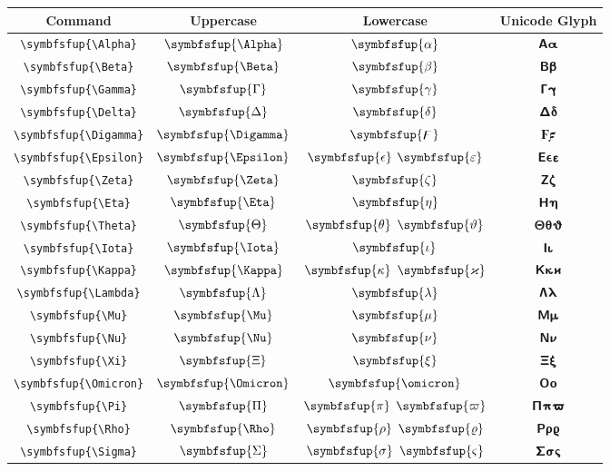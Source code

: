 \documentclass[12pt,a4paper]{article}
\begin{document}
\begin{longtable}{|c|c|c|c|}
\hline
\textbf{Command} & \textbf{Uppercase} & \textbf{Lowercase} & \textbf{Unicode Glyph} \\
\hline
\verb|\symbfsfup{\Alpha}| & $\symbfsfup{\Alpha}$ & $\symbfsfup{\alpha}$ & $ 𝝖 𝝰 $ \\
\verb|\symbfsfup{\Beta}| & $\symbfsfup{\Beta}$ & $\symbfsfup{\beta}$ & $ 𝝗 𝝱 $ \\
\verb|\symbfsfup{\Gamma}| & $\symbfsfup{\Gamma}$ & $\symbfsfup{\gamma}$ & $ 𝝘 𝝲 $ \\
\verb|\symbfsfup{\Delta}| & $\symbfsfup{\Delta}$ & $\symbfsfup{\delta}$ & $ 𝝙 𝝳 $ \\
\verb|\symbfsfup{\Digamma}| & $\symbfsfup{\Digamma}$ & $\symbfsfup{\digamma}$ & $ 𝟊 𝟋 $ \\
\verb|\symbfsfup{\Epsilon}| & $\symbfsfup{\Epsilon}$ & $\symbfsfup{\epsilon}$ $\symbfsfup{\varepsilon}$ & $ 𝝚 𝞊 𝝴 $ \\
\verb|\symbfsfup{\Zeta}| & $\symbfsfup{\Zeta}$ & $\symbfsfup{\zeta}$ & $ 𝝛 𝝵 $ \\
\verb|\symbfsfup{\Eta}| & $\symbfsfup{\Eta}$ & $\symbfsfup{\eta}$ & $ 𝝜 𝝶 $ \\
\verb|\symbfsfup{\Theta}| & $\symbfsfup{\Theta}$ & $\symbfsfup{\theta}$ $\symbfsfup{\vartheta}$ & $ 𝝝 𝝷 𝞋 $ \\
\verb|\symbfsfup{\Iota}| & $\symbfsfup{\Iota}$ & $\symbfsfup{\iota}$ & $ 𝝞 𝝸 $ \\
\verb|\symbfsfup{\Kappa}| & $\symbfsfup{\Kappa}$ & $\symbfsfup{\kappa}$ $\symbfsfup{\varkappa}$ & $ 𝝟 𝝹 𝞌 $ \\
\verb|\symbfsfup{\Lambda}| & $\symbfsfup{\Lambda}$ & $\symbfsfup{\lambda}$ & $ 𝝠 𝝺 $ \\
\verb|\symbfsfup{\Mu}| & $\symbfsfup{\Mu}$ & $\symbfsfup{\mu}$ & $ 𝝡 𝝻 $ \\
\verb|\symbfsfup{\Nu}| & $\symbfsfup{\Nu}$ & $\symbfsfup{\nu}$ & $ 𝝢 𝝼 $ \\
\verb|\symbfsfup{\Xi}| & $\symbfsfup{\Xi}$ & $\symbfsfup{\xi}$ & $ 𝝣 𝝽 $ \\
\verb|\symbfsfup{\Omicron}| & $\symbfsfup{\Omicron}$ & $\symbfsfup{\omicron}$ & $ 𝝤 𝝾 $ \\
\verb|\symbfsfup{\Pi}| & $\symbfsfup{\Pi}$ & $\symbfsfup{\pi}$ $\symbfsfup{\varpi}$ & $ 𝝥 𝝿 𝞏 $ \\
\verb|\symbfsfup{\Rho}| & $\symbfsfup{\Rho}$ & $\symbfsfup{\rho}$ $\symbfsfup{\varrho}$ & $ 𝝦 𝞀 𝞎 $ \\
\verb|\symbfsfup{\Sigma}| & $\symbfsfup{\Sigma}$ & $\symbfsfup{\sigma}$ $\symbfsfup{\varsigma}$ & $ 𝝨 𝞂 𝞁 $ \\

\end{longtable}
\end{document}
